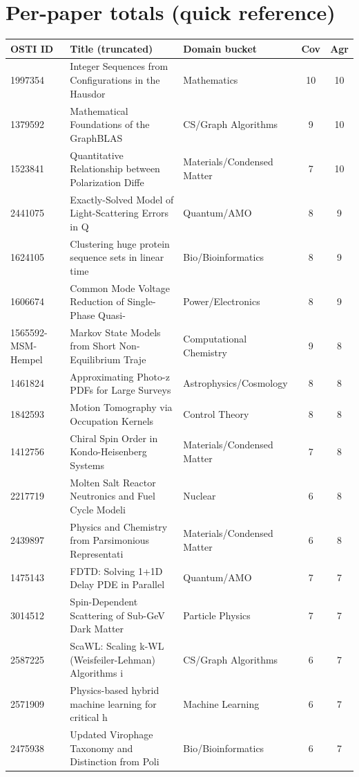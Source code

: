 \section{Per-paper totals (quick reference)}
\begin{longtable}{lllcc}
\toprule
OSTI ID & Title (truncated) & Domain bucket & Cov & Agr \\\midrule
\endhead
1997354 & Integer Sequences from Configurations in the Hausdor & Mathematics & 10 & 10 \\
1379592 & Mathematical Foundations of the GraphBLAS & CS/Graph Algorithms & 9 & 10 \\
1523841 & Quantitative Relationship between Polarization Diffe & Materials/Condensed Matter & 7 & 10 \\
2441075 & Exactly-Solved Model of Light-Scattering Errors in Q & Quantum/AMO & 8 & 9 \\
1624105 & Clustering huge protein sequence sets in linear time & Bio/Bioinformatics & 8 & 9 \\
1606674 & Common Mode Voltage Reduction of Single-Phase Quasi- & Power/Electronics & 8 & 9 \\
1565592-MSM-Hempel & Markov State Models from Short Non-Equilibrium Traje & Computational Chemistry & 9 & 8 \\
1461824 & Approximating Photo-z PDFs for Large Surveys & Astrophysics/Cosmology & 8 & 8 \\
1842593 & Motion Tomography via Occupation Kernels & Control Theory & 8 & 8 \\
1412756 & Chiral Spin Order in Kondo-Heisenberg Systems & Materials/Condensed Matter & 7 & 8 \\
2217719 & Molten Salt Reactor Neutronics and Fuel Cycle Modeli & Nuclear & 6 & 8 \\
2439897 & Physics and Chemistry from Parsimonious Representati & Materials/Condensed Matter & 6 & 8 \\
1475143 & FDTD: Solving 1+1D Delay PDE in Parallel & Quantum/AMO & 7 & 7 \\
3014512 & Spin-Dependent Scattering of Sub-GeV Dark Matter & Particle Physics & 7 & 7 \\
2587225 & ScaWL: Scaling k-WL (Weisfeiler-Lehman) Algorithms i & CS/Graph Algorithms & 6 & 7 \\
2571909 & Physics-based hybrid machine learning for critical h & Machine Learning & 6 & 7 \\
2475938 & Updated Virophage Taxonomy and Distinction from Poli & Bio/Bioinformatics & 6 & 7 \\

\end{longtable}
